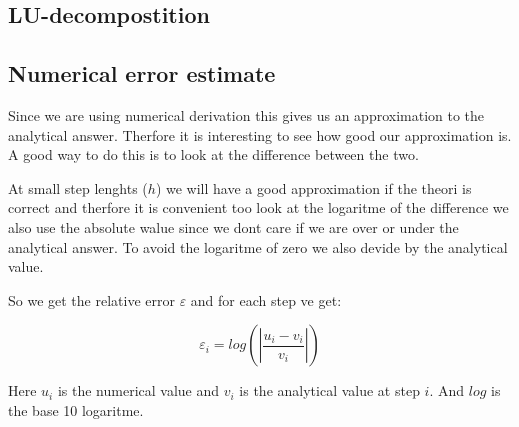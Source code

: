 \documentclass[twoside,twocolumn]{article}
\newcommand{\nl}{

\medskip
\noindent
}
\begin{document}
\subsection{LU-decompostition}


\subsection{Numerical error estimate}

Since we are using numerical derivation this gives us an approximation to the analytical answer.
Therfore it is interesting to see how good our approximation is.    
A good way to do this is to look at the difference between the two.
\nl
At small step lenghts ($h$) we will have a good approximation if the theori is correct and therfore it is convenient too look at the logaritme of the difference we also use the absolute walue since we dont care if we are over or under the analytical answer. To avoid the logaritme of zero we also devide by the analytical value.
\nl
So we get the relative error $\varepsilon$ and for each step ve get:

\begin{equation}
\varepsilon_i = log\left(\left|\frac{u_i - v_i}{v_i}\right|\right)
\end{equation}

Here $u_i$ is the numerical value and $v_i$ is the analytical value at step $i$. And $log$ is the base 10 logaritme.
\end{document}
